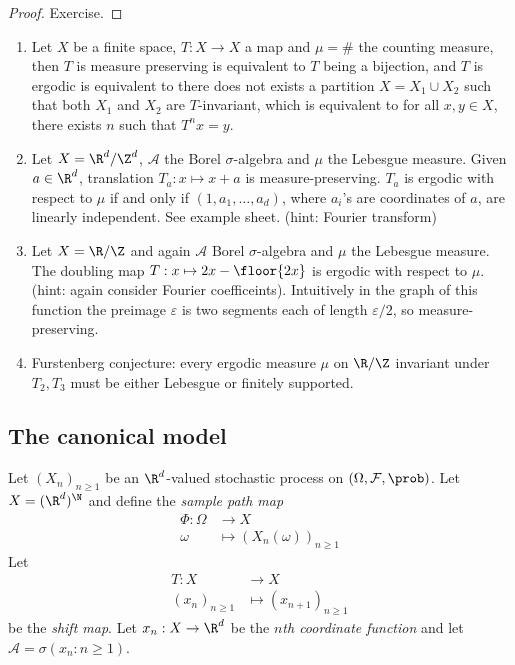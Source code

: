 \documentclass[a4paper]{article}
\renewcommand{\P}{\prob} %
\begin{document}

\begin{proof}
  Exercise.
\end{proof}

\begin{eg}\leavevmode
  \begin{enumerate}
  \item Let \(X\) be a finite space, \(T: X \to X\) a map and \(\mu = \#\) the counting measure, then \(T\) is measure preserving is equivalent to \(T\) being a bijection, and \(T\) is ergodic is equivalent to there does not exists a partition \(X = X_1 \cup X_2\) such that both \(X_1\) and \(X_2\) are \(T\)-invariant, which is equivalent to for all \(x, y \in X\), there exists \(n\) such that \(T^n x = y\).
  \item Let \(X = \R^d/\Z^d\), \(\mathcal A\) the Borel \(\sigma\)-algebra and \(\mu\) the Lebesgue measure. Given \(a \in \R^d\), translation \(T_a: x \mapsto x + a\) is measure-preserving. \(T_a\) is ergodic with respect to \(\mu\) if and only if \((1, a_1, \dots, a_d)\), where \(a_i\)'s are coordinates of \(a\), are linearly independent. See example sheet. (hint: Fourier transform)
  \item Let \(X = \R/\Z\) and again \(\mathcal A\) Borel \(\sigma\)-algebra and \(\mu\) the Lebesgue measure. The doubling map \(T: x \mapsto 2x - \floor{2x}\) is ergodic with respect to \(\mu\). (hint: again consider Fourier coefficeints). Intuitively in the graph of this function the preimage \(\varepsilon\) is two segments each of length \(\varepsilon/2\), so measure-preserving.
  \item Furstenberg conjecture: every ergodic measure \(\mu\) on \(\R/\Z\) invariant under \(T_2, T_3\) must be either Lebesgue or finitely supported.
  \end{enumerate}
\end{eg}

\subsection{The canonical model}

Let \((X_n)_{n \geq 1}\) be an \(\R^d\)-valued stochastic process on \((\Omega, \mathcal F, \P)\). Let \(X = (\R^d)^\N\) and define the \emph{sample path map}
\begin{align*}
  \Phi: \Omega &\to X \\
  \omega &\mapsto (X_n(\omega))_{n \geq 1}
\end{align*}
Let
\begin{align*}
  T: X &\to X \\
  (x_n)_{n \geq 1} &\mapsto (x_{n + 1})_{n \geq 1}
\end{align*}
be the \emph{shift map}. Let \(x_n: X \to \R^d\) be the \emph{\(n\)th coordinate function} and let \(\mathcal A = \sigma(x_n: n \geq 1)\).
\end{document}
